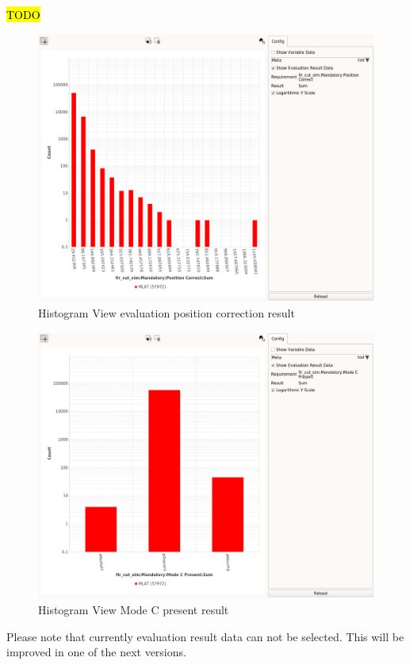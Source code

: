\hl{TODO} %

\begin{figure}[H]
    \hspace*{-2cm}
    \includegraphics[width=18cm,frame]{figures/histogram_eval_pos_correct.png}
  \caption{Histogram View evaluation position correction result}
\end{figure}

\begin{figure}[H]
    \hspace*{-2cm}
    \includegraphics[width=18cm,frame]{figures/histogram_eval_mc.png}
  \caption{Histogram View Mode C present result}
\end{figure}

Please note that currently evaluation result data can not be selected. This will be improved in one of the next versions.
